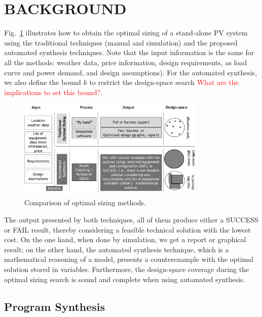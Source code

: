 \documentclass[runningheads]{llncs}
\begin{document}
\section{BACKGROUND}
\label{sec:AutomatedVerification}
Fig.~\ref{fig:optimization} illustrates how to obtain the optimal sizing of a stand-alone PV system using the traditional techniques (manual and simulation) and the proposed automated synthesis techniques. Note that the input information is the same for all the methods: weather data, price information, design requirements, as load curve and power demand, and design assumptions). For the automated synthesis, we also define the bound $k$ to restrict the design-space search \textcolor{red}{What are the implications to set this bound?}. 
%
\begin{figure}[h]
\includegraphics[width=0.8\textwidth]{optimalsizingprocess3}
\centering
\caption{Comparison of optimal sizing methods.}
\label{fig:optimization}
\end{figure}

The output presented by both techniques, all of them produce either a SUCCESS or FAIL result, thereby considering a feasible technical solution with the lowest cost. On the one hand, when done by simulation, we get a report or graphical result; on the other hand, the automated synthesis technique, which is a mathematical reasoning of a model, presents a counterexample with the optimal solution stored in variables. Furthermore, the design-space coverage during the optimal sizing search is sound and complete when using automated synthesis.

\subsection{Program Synthesis}
\label{sec:ProgramSynthesis}
\end{document}
